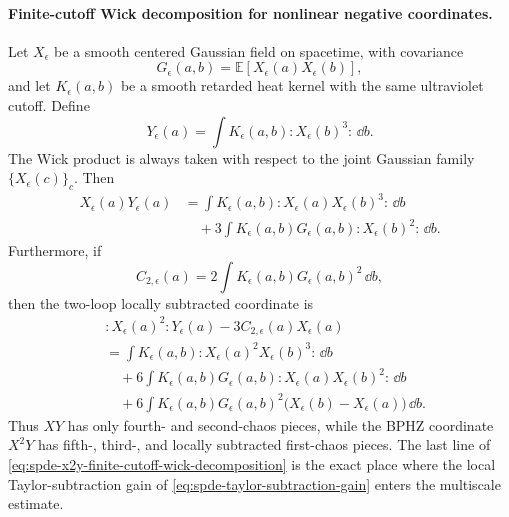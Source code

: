 \paragraph{Finite-cutoff Wick decomposition for nonlinear negative coordinates.}
Let \(X_\epsilon\) be a smooth centered Gaussian field on spacetime, with
covariance
\[
  G_\epsilon(a,b)
  =
  \mathbb E[X_\epsilon(a)X_\epsilon(b)] ,
\]
and let \(K_\epsilon(a,b)\) be a smooth retarded heat kernel with the same
ultraviolet cutoff.  Define
\[
  Y_\epsilon(a)
  =
  \int K_\epsilon(a,b):X_\epsilon(b)^3:\,\dd b .
\]
The Wick product is always taken with respect to the joint Gaussian family
\(\{X_\epsilon(c)\}_c\).  Then
\begin{equation}
\begin{aligned}
  X_\epsilon(a)Y_\epsilon(a)
  &=
  \int K_\epsilon(a,b)
  :X_\epsilon(a)X_\epsilon(b)^3:\,\dd b                  \\
  &\quad
  +3\int K_\epsilon(a,b)G_\epsilon(a,b)
  :X_\epsilon(b)^2:\,\dd b .
\end{aligned}
  \label{eq:spde-xy-finite-cutoff-wick-decomposition}
\end{equation}
Furthermore, if
\begin{equation}
  C_{2,\epsilon}(a)
  =
  2\int K_\epsilon(a,b)G_\epsilon(a,b)^2\,\dd b ,
  \label{eq:spde-c2-local-coordinate-for-x2y}
\end{equation}
then the two-loop locally subtracted coordinate is
\begin{equation}
\begin{aligned}
  &:\!X_\epsilon(a)^2\!:Y_\epsilon(a)-3C_{2,\epsilon}(a)X_\epsilon(a) \\
  &=
  \int K_\epsilon(a,b)
  :X_\epsilon(a)^2X_\epsilon(b)^3:\,\dd b                         \\
  &\quad
  +6\int K_\epsilon(a,b)G_\epsilon(a,b)
  :X_\epsilon(a)X_\epsilon(b)^2:\,\dd b                            \\
  &\quad
  +6\int K_\epsilon(a,b)G_\epsilon(a,b)^2
  \bigl(X_\epsilon(b)-X_\epsilon(a)\bigr)\,\dd b .
\end{aligned}
  \label{eq:spde-x2y-finite-cutoff-wick-decomposition}
\end{equation}
Thus \(XY\) has only fourth- and second-chaos pieces, while the BPHZ
coordinate \(X^2Y\) has fifth-, third-, and locally subtracted first-chaos
pieces.  The last line of
\eqref{eq:spde-x2y-finite-cutoff-wick-decomposition} is the exact place
where the local Taylor-subtraction gain of
\eqref{eq:spde-taylor-subtraction-gain} enters the multiscale estimate.


